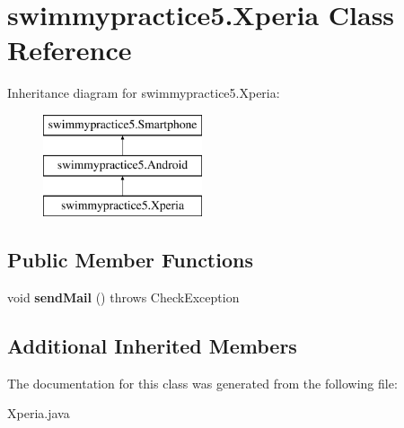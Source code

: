 \hypertarget{classswimmypractice5_1_1_xperia}{}\section{swimmypractice5.\+Xperia Class Reference}
\label{classswimmypractice5_1_1_xperia}
Inheritance diagram for swimmypractice5.\+Xperia\+:\begin{figure}[H]
\begin{center}
\leavevmode
\includegraphics[height=3.000000cm]{classswimmypractice5_1_1_xperia}
\end{center}
\end{figure}
\subsection*{Public Member Functions}
\begin{DoxyCompactItemize}
\item 
\mbox{\label{classswimmypractice5_1_1_xperia_a26c4b5fd95e2ca6ecd7f5c4d0a896f89}} 
void {\bfseries send\+Mail} ()  throws Check\+Exception
\end{DoxyCompactItemize}
\subsection*{Additional Inherited Members}


The documentation for this class was generated from the following file\+:\begin{DoxyCompactItemize}
\item 
Xperia.\+java\end{DoxyCompactItemize}
